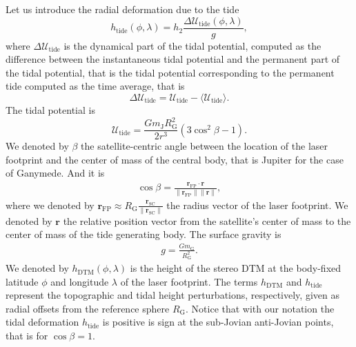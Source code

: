 \documentclass[lineno, pdflatex,sn-mathphys-ay]{sn-jnl}
\theoremstyle{thmstyleone}%
\theoremstyle{thmstyletwo}%
\theoremstyle{thmstylethree}%
\renewcommand{\vec}[1]{\boldsymbol{#1}}
\begin{document}
Let us introduce the radial deformation due to the tide 
\begin{equation}
h_{\mathrm{tide}}(\phi, \lambda) = 
h_2 \frac{\Delta \mathcal{U}_{\mathrm{tide}}(\phi, \lambda)}{g},
\end{equation}
where $\Delta \mathcal{U}_{\mathrm{tide}}$ is the dynamical part of the tidal potential, computed as the difference between the instantaneous tidal potential and the permanent part of the tidal potential, that is the tidal potential corresponding to the permanent tide computed as the time average, that is 
\begin{equation}
	\Delta \mathcal{U}_{\mathrm{tide}} = \mathcal{U}_{\mathrm{tide}} - \langle\mathcal{U}_{\mathrm{tide}}\rangle.
\end{equation}
%
The tidal potential is %
\begin{equation} %
	\mathcal{U}_{\mathrm{tide}} =  \frac{G m_{\mathrm{J}} R_{\mathrm{G}}^2}{2 r^3} \left( 3\cos^2\beta -1 \right).
\end{equation}
%
We denoted by $\beta$ the satellite-centric angle between the location of the laser footprint and the center of mass of the central body, that is Jupiter for the case of Ganymede. And it is
\begin{align}
	\label{eq:beta_angle}
	\cos \beta = \frac{\vec{r}_{\mathrm{FP}}\cdot \vec{r}}{\|\vec{r}_{\mathrm{FP}}\| \| \vec{r} \|},
\end{align}
%
where we denoted by 
${\vec{r}_{\mathrm{FP}} \approx R_\mathrm{G} \frac{\vec{r}_{\mathrm{SC}}}{\| \vec{r}_{\mathrm{SC}}\|} }$ the radius vector of the laser footprint.
We denoted by $\vec{r}$ the relative position vector from the satellite's center of mass to the center of mass of the tide generating body.
The surface gravity is 
\begin{align}
	\label{eq:surface_gravity}
	g = \frac{G m_{\mathrm{G}}}{R_{\mathrm{G}}^2}.
\end{align}
%
We denoted by $h_{\mathrm{DTM}}(\phi, \lambda)$  is the height of the stereo DTM at the body-fixed latitude \(\phi\) and longitude \(\lambda\) of the laser footprint.
%
The terms $h_{\mathrm{DTM}}$ and $h_{\mathrm{tide}}$ represent the topographic and tidal height perturbations, respectively, given as radial offsets from the reference sphere $R_{\mathrm{G}}$.
%
Notice that with our notation the tidal deformation $h_{\mathrm{tide}}$ is positive is sign at the sub-Jovian anti-Jovian points, that is for ${\cos\beta = 1}$. 
\end{document}
